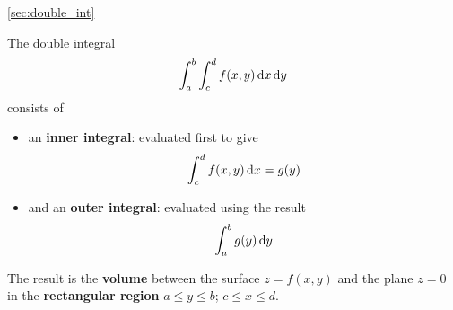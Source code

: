 \begin{recap}{\ref{sec:double_int}}
\item The double integral
\[
\int_a^b\int_c^d f(x,y)\,{\rm d}x\,{\rm d}y
\]
consists of
\begin{itemize}
\item an \textbf{inner integral}: evaluated first to give
\[
\int_c^d f(x,y)\,{\rm d}x=g(y)
\]
\item and an \textbf{outer integral}: evaluated using the result
\[
\int_a^b g(y)\,{\rm d}y
\]
\end{itemize}
\item The result is the \textbf{volume} between the surface $z=f(x,y)$ and the plane $z=0$ in the \textbf{rectangular region} $a\leq y\leq b$; $c\leq x\leq d$.
\end{recap}

